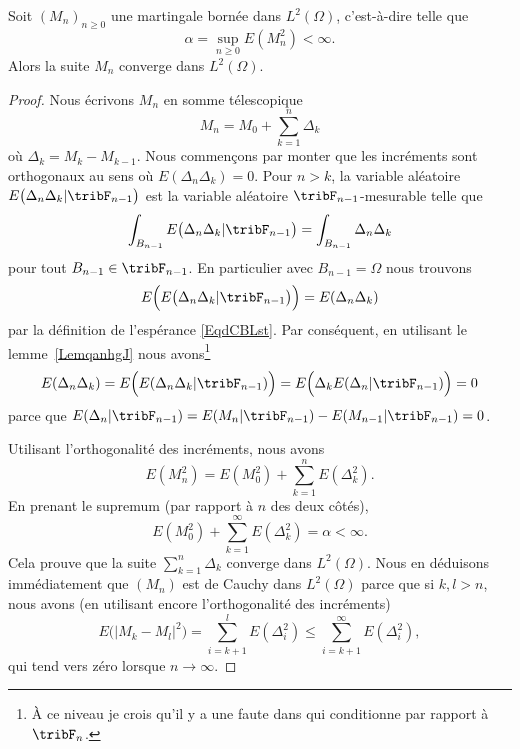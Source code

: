 \begin{theorem}     \label{ThobysyWI}
    Soit \( (M_n)_{n\geq 0}\) une martingale bornée dans \( L^2(\Omega)\), c'est-à-dire telle que
    \begin{equation}
        \alpha=\sup_{n\geq 0}E(M_n^2)<\infty.
    \end{equation}
    Alors la suite \( M_n\) converge dans \( L^2(\Omega)\).
\end{theorem}

\begin{proof}
    Nous écrivons \( M_n\) en somme télescopique
    \begin{equation}
        M_n=M_0+\sum_{k=1}^n\Delta_k
    \end{equation}
    où \( \Delta_k=M_k-M_{k-1}\). Nous commençons par monter que les incréments sont orthogonaux au sens où \( E(\Delta_n\Delta_k)=0\). Pour \( n>k\), la variable aléatoire \( E\big( \Delta_n\Delta_k|\tribF_{n-1} \big)\) est la variable aléatoire \( \tribF_{n-1}\)-mesurable telle que
    \begin{equation}
        \int_{B_{n-1}}E\big( \Delta_n\Delta_k|\tribF_{n-1} \big)=\int_{B_{n-1}}\Delta_n\Delta_k
    \end{equation}
    pour tout \( B_{n-1}\in\tribF_{n-1}\). En particulier avec \( B_{n-1}=\Omega\) nous trouvons
    \begin{equation}
        E\Big( E\big( \Delta_n\Delta_k|\tribF_{n-1} \big)\Big)=E(\Delta_n\Delta_k)
    \end{equation}
    par la définition de l'espérance \eqref{EqdCBLst}. Par conséquent, en utilisant le lemme~\ref{LemqanhgJ} nous avons\footnote{À ce niveau je crois qu'il y a une faute dans \cite{PMCmartinLP} qui conditionne par rapport à \( \tribF_n\).}
    \begin{equation}
        E(\Delta_n\Delta_k)=E\Big( E(\Delta_n\Delta_k|\tribF_{n-1}) \Big)=E\Big( \Delta_kE(\Delta_n|\tribF_{n-1}) \Big)=0
    \end{equation}
    parce que \( E(\Delta_n|\tribF_{n-1})=E(M_n|\tribF_{n-1})-E(M_{n-1}|\tribF_{n-1})=0\).

    Utilisant l'orthogonalité des incréments, nous avons
    \begin{equation}
        E(M_n^2)=E(M_0^2)+\sum_{k=1}^nE(\Delta_k^2).
    \end{equation}
    En prenant le supremum (par rapport à \( n\) des deux côtés),
    \begin{equation}
        E(M_0^2)+\sum_{k=1}^{\infty}E(\Delta_k^2)=\alpha<\infty.
    \end{equation}
    Cela prouve que la suite \( \sum_{k=1}^n\Delta_k\) converge dans \( L^2(\Omega)\). Nous en déduisons immédiatement que \( (M_n)\) est de Cauchy dans \( L^2(\Omega)\) parce que si \( k,l>n\), nous avons (en utilisant encore l'orthogonalité des incréments)
    \begin{equation}
        E\big( | M_k-M_l |^2 \big)=\sum_{i=k+1}^lE(\Delta_i^2)\leq\sum_{i=k+1}^{\infty}E(\Delta_i^2),
    \end{equation}
    qui tend vers zéro lorsque \( n\to\infty\).
\end{proof}

